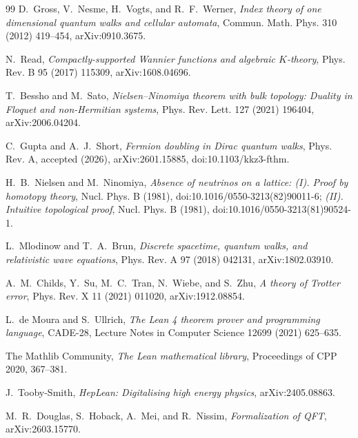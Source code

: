 \documentclass[11pt]{article}
\begin{document}
\begin{thebibliography}{99}
D.~Gross, V.~Nesme, H.~Vogts, and R.~F.~Werner,
\emph{Index theory of one dimensional quantum walks and cellular automata},
Commun. Math. Phys. 310 (2012) 419--454, arXiv:0910.3675.

N.~Read,
\emph{Compactly-supported Wannier functions and algebraic $K$-theory},
Phys. Rev. B 95 (2017) 115309, arXiv:1608.04696.

T.~Bessho and M.~Sato,
\emph{Nielsen--Ninomiya theorem with bulk topology: Duality in Floquet and
non-Hermitian systems}, Phys. Rev. Lett. 127 (2021) 196404,
arXiv:2006.04204.

C.~Gupta and A.~J.~Short,
\emph{Fermion doubling in Dirac quantum walks},
Phys. Rev. A, accepted (2026), arXiv:2601.15885,
doi:10.1103/kkz3-fthm.

H.~B.~Nielsen and M.~Ninomiya,
\emph{Absence of neutrinos on a lattice: (I). Proof by homotopy theory},
Nucl. Phys. B (1981), doi:10.1016/0550-3213(82)90011-6;
\emph{(II). Intuitive topological proof},
Nucl. Phys. B (1981), doi:10.1016/0550-3213(81)90524-1.

L.~Mlodinow and T.~A.~Brun,
\emph{Discrete spacetime, quantum walks, and relativistic wave equations},
Phys. Rev. A 97 (2018) 042131, arXiv:1802.03910.

A.~M.~Childs, Y.~Su, M.~C.~Tran, N.~Wiebe, and S.~Zhu,
\emph{A theory of Trotter error}, Phys. Rev. X 11 (2021) 011020,
arXiv:1912.08854.

L.~de Moura and S.~Ullrich,
\emph{The Lean 4 theorem prover and programming language},
CADE-28, Lecture Notes in Computer Science 12699 (2021) 625--635.

The Mathlib Community,
\emph{The Lean mathematical library}, Proceedings of CPP 2020, 367--381.

J.~Tooby-Smith,
\emph{HepLean: Digitalising high energy physics}, arXiv:2405.08863.

M.~R.~Douglas, S.~Hoback, A.~Mei, and R.~Nissim,
\emph{Formalization of QFT}, arXiv:2603.15770.

\end{thebibliography}
\end{document}
